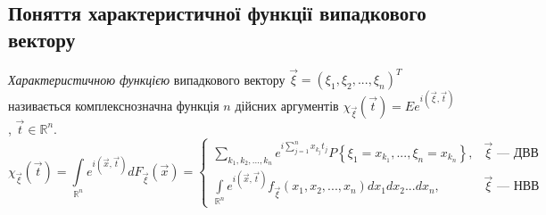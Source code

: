 \subsection{Поняття характеристичної функції випадкового вектору}
\begin{definition}
    \emph{Характеристичною функцією} випадкового вектору $\vec{\xi} = \left( \xi_1, \xi_2, ..., \xi_n\right)^T$ 
    називається комплекснозначна функція $n$ дійсних аргументів $\chi_{\vec{\xi}}(\vec{t}) = Ee^{i(\vec{\xi}, \vec{t})}$, $\vec{t} \in \mathbb{R}^n$.
    \begin{equation}\label{eq:char_func_vect}
        \chi_{\vec{\xi}}(\vec{t}) = \int\limits_{\mathbb{R}^n} e^{i(\vec{x}, \vec{t})} dF_{\vec{\xi}}(\vec{x}) = \begin{cases}
            \sum\limits_{k_1,k_2, ..., k_n} e^{i \sum\limits_{j=1}^n x_{k_j}t_j} P\left\{\xi_1 = x_{k_1}, ..., \xi_n = x_{k_n}\right\}, & \vec{\xi} \text{ --- ДВВ} \\
            \int\limits_{\mathbb{R}^n} e^{i(\vec{x}, \vec{t})} f_{\vec{\xi}}(x_1, x_2, ..., x_n)dx_1 dx_2 ... dx_n, & \vec{\xi} \text{ --- НВВ}
        \end{cases}
    \end{equation}
\end{definition}

